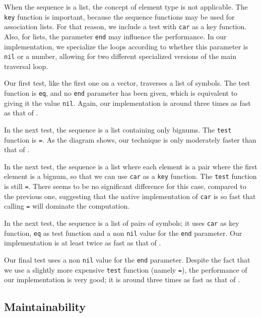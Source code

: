 When the sequence is a list, the concept of element type is not
applicable.  The \texttt{key} function is important, because the
sequence functions may be used for association lists.  For that
reason, we include a test with \texttt{car} as a key function.  Also,
for lists, the parameter \texttt{end} may influence the performance.
In our implementation, we specialize the loops according to whether
this parameter is \texttt{nil} or a number, allowing for two different
specialized versions of the main traversal loop.

Our first test, like the first one on a vector, traverses a list of
symbols.  The test function is \texttt{eq}, and no \texttt{end}
parameter has been given, which is equivalent to giving it the value
\texttt{nil}.  Again, our implementation is around three times as fast
as that of \sbcl{}.


In the next test, the sequence is a list containing only bignums.  The
\texttt{test} function is \texttt{=}.  As the diagram shows, our
technique is only moderately faster than that of \sbcl{}.


In the next test, the sequence is a list where each element is a pair
where the first element is a bignum, so that we can use \texttt{car}
as a \texttt{key} function.  The \texttt{test} function is still
\texttt{=}.  There seems to be no significant difference for this
case, compared to the previous one, suggesting that the native
implementation of \texttt{car} is so fast that calling \texttt{=} will
dominate the computation.


In the next test, the sequence is a list of pairs of symbols; it uses
\texttt{car} as key function, \texttt{eq} as test function and a non
\texttt{nil} value for the \texttt{end} parameter. Our implementation
is at least twice as fast as that of \sbcl{}.


Our final test uses a non \texttt{nil} value for the \texttt{end}
parameter.  Despite the fact that we use a slightly more expensive
\texttt{test} function (namely \texttt{=}), the performance of our
implementation is very good; it is around three times as fast as that
of \sbcl{}.


\subsection{Maintainability}

